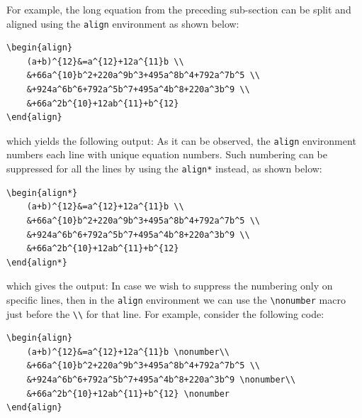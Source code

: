 		For example, the long equation from the preceding sub-section can be split and aligned using the \lstinline|align| environment as shown below:
\begin{lstlisting}
\begin{align}
	(a+b)^{12}&=a^{12}+12a^{11}b \\
	&+66a^{10}b^2+220a^9b^3+495a^8b^4+792a^7b^5 \\
	&+924a^6b^6+792a^5b^7+495a^4b^8+220a^3b^9 \\
	&+66a^2b^{10}+12ab^{11}+b^{12}
\end{align}
\end{lstlisting}
		which yields the following output:
		\setcounter{equation}{0}
		\newpage
		As it can be observed, the \lstinline|align| environment numbers each line with unique equation numbers. Such numbering can be suppressed for all the lines by using the \lstinline|align*| instead, as shown below:
\begin{lstlisting}
\begin{align*}
	(a+b)^{12}&=a^{12}+12a^{11}b \\
	&+66a^{10}b^2+220a^9b^3+495a^8b^4+792a^7b^5 \\
	&+924a^6b^6+792a^5b^7+495a^4b^8+220a^3b^9 \\
	&+66a^2b^{10}+12ab^{11}+b^{12}
\end{align*}
\end{lstlisting}
		which gives the output:
		In case we wish to suppress the numbering only on specific lines, then in the \lstinline|align| environment we can use the \lstinline|\nonumber| macro just before the \lstinline|\\| for that line. For example, consider the following code:
\begin{lstlisting}
\begin{align}
	(a+b)^{12}&=a^{12}+12a^{11}b \nonumber\\
	&+66a^{10}b^2+220a^9b^3+495a^8b^4+792a^7b^5 \\
	&+924a^6b^6+792a^5b^7+495a^4b^8+220a^3b^9 \nonumber\\
	&+66a^2b^{10}+12ab^{11}+b^{12} \nonumber
\end{align}
\end{lstlisting}
